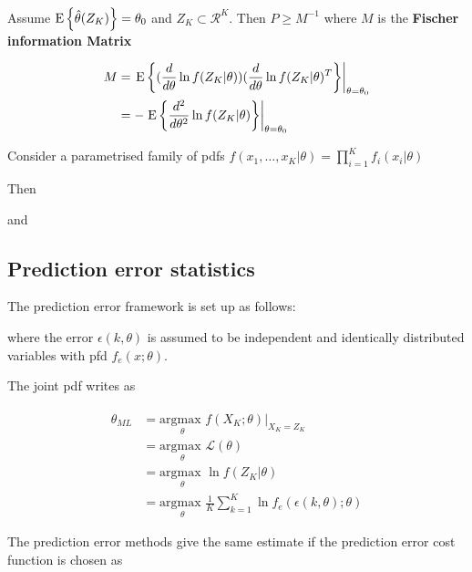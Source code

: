 \documentclass[10pt,a4paper]{scrartcl}
\begin{document}
\begin{multicols*}{2}

Assume $\text{E}\left\{\hat{\theta}(Z_K)\right\}=\theta_0$ and $Z_K\subset\mathcal{R}^K$. Then $P\geq M^{-1}$ where $M$ is the \textbf{Fischer information Matrix}

\begin{align*}
M&=\left.\text{E}\left\{(\frac{d}{d\theta}\ln f(Z_K|\theta))(\frac{d}{d\theta}\ln f(Z_K|\theta)^T\right\}\right|_{\theta=\theta_0}\\
&=-\left.\text{E}\left\{\frac{d^2}{d\theta^2}\ln f(Z_K|\theta)\right\}\right|_{\theta=\theta_0}
\end{align*}

Consider a parametrised family of pdfs $f(x_1,\ldots,x_K|\theta)=\prod\limits_{i=1}^Kf_i(x_i|\theta)$

Then


and 


\subsection{Prediction error statistics}

The prediction error framework is set up as follows:


where the error $\epsilon(k,\theta)$ is assumed to be independent and identically distributed variables with pfd $f_e(x;\theta)$.

The joint pdf writes as


\newcommand{\targmax}{\underset{\theta}{\text{argmax }}}
\begin{align*}
\hat{\theta}_{ML}&=\targmax f(X_K;\theta)|_{X_K=Z_K}\\
&=\targmax \mathcal{L}(\theta)\\
&=\targmax \ln f(Z_K|\theta)\\
&=\targmax\frac{1}{K}\sum\limits_{k=1}^K\ln f_e(\epsilon(k,\theta);\theta)
\end{align*}

The prediction error methods give the same estimate if the prediction error cost function is chosen as


\end{multicols*}
\end{document}
